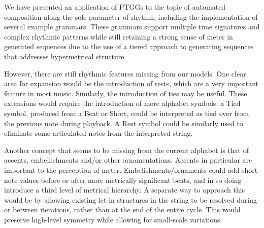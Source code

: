 \documentclass{article}
\begin{document}
We have presented an application of PTGGs to the topic of automated composition along the sole parameter of rhythm, including the implementation of several example grammars. These grammars support multiple time signatures and complex rhythmic patterns while still retaining a strong sense of meter in generated sequences due to the use of a tiered approach to generating sequences that addresses hypermetrical structure. 



However, there are still rhythmic features missing from our models. 
One clear area for expansion would be the introduction of rests, which are a very important feature in most music. Similarly, the introduction of ties may be useful. These extensions would require the introduction of more alphabet symbols: a Tied symbol, produced from a Beat or Short, could be interpreted as tied over from the previous note during playback. A Rest symbol could be similarly used to eliminate some articulated notes from the interpreted string. 

Another concept that seems to be missing from the current alphabet is that of accents, embellishments and/or other ornamentations. Accents in particular are important to the perception of meter. Embelishments/ornaments could add short note values before or after more metrically significant beats, and in so doing introduce a third level of metrical hierarchy. A separate way to approach this would be by allowing existing let-in structures in the string to be resolved during or between iterations, rather than at the end of the entire cycle. This would preserve high-level symmetry while allowing for small-scale variations.

\end{document}
